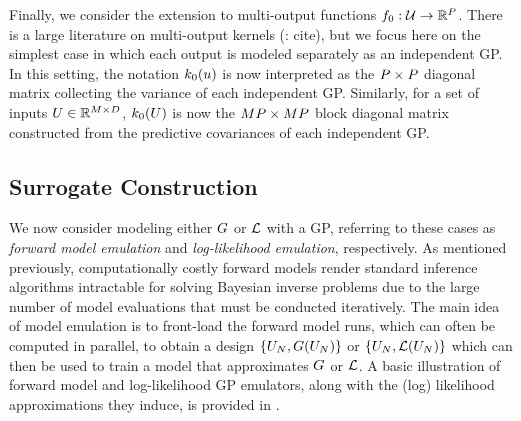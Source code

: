 \documentclass[12pt]{article}
\begin{document}
Finally, we consider the extension to multi-output functions $f_{0}: \mathcal{U} \to \mathbb{R}^{P}$. There is a large literature on multi-output 
kernels (\todo: cite), but we focus here on the simplest case in which each output is modeled separately as an independent GP. 
In this setting, the notation $k_0(u)$ is now interpreted as the $P \times P$ diagonal matrix collecting the variance of each 
independent GP. Similarly, for a set of inputs $U \in \mathbb{R}^{M \times D}$, $k_0(U)$ is now the 
$MP \times MP$ block diagonal matrix constructed from the predictive covariances of each independent GP. 

\subsection{Surrogate Construction}
We now consider modeling either $G$ or $\mathcal{L}$ with a GP, referring to these cases as \textit{forward model emulation} and 
\textit{log-likelihood emulation}, respectively. As mentioned previously, computationally costly forward models render 
standard inference algorithms intractable for solving Bayesian inverse problems due to the large number of model 
evaluations that must be conducted iteratively. The main idea of model emulation is to front-load the forward model 
runs, which can often be computed in parallel, to obtain a design $\{U_{N}, G(U_{N})\}$ or 
$\{U_{N}, \mathcal{L}(U_{N})\}$ which can then be used to train a model that 
approximates $G$ or $\mathcal{L}$. A basic illustration of forward model and log-likelihood GP emulators, along with the 
(log) likelihood approximations they induce, is provided in . 
\end{document}
